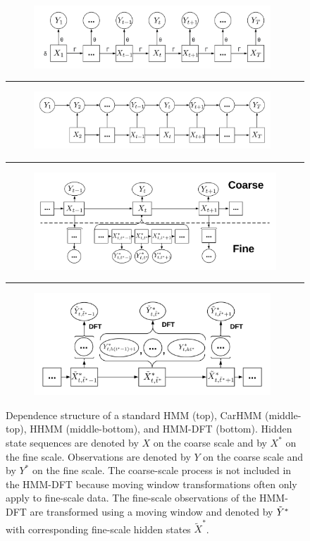 
\begin{figure}[ht]
    \begin{subfigure}{\textwidth}
      \centering
      \includegraphics[width=3.5in]{../Plots/HMM.png}  
      \label{fig:HMM}
    \end{subfigure}
    \hrule
    \begin{subfigure}{\textwidth}
      \centering
      \includegraphics[width=3.5in]{../Plots/CarHMM.png}  
      \label{fig:CarHMM}
    \end{subfigure}
    \hrule
    \begin{subfigure}{\textwidth}
      \centering
      \includegraphics[width=3.75in]{../Plots/HHMM.png}  
      \label{fig:HHMM}
    \end{subfigure}
    \hrule
    \begin{subfigure}{\textwidth}
      \centering
      \includegraphics[width=3.5in]{../Plots/HMM-DFT.png}  
      \label{fig:HMM-DFT}
    \end{subfigure}
    \caption{Dependence structure of a standard HMM (top), CarHMM (middle-top), HHMM (middle-bottom), and HMM-DFT (bottom). Hidden state sequences are denoted by $X$ on the coarse scale and by $X^*$ on the fine scale. Observations are denoted by $Y$ on the coarse scale and by $Y^*$ on the fine scale. The coarse-scale process is not included in the HMM-DFT because moving window transformations often only apply to fine-scale data. The fine-scale observations of the HMM-DFT are transformed using a moving window and denoted by $\tilde{Y}^*$ with corresponding fine-scale hidden states $\tilde X^*$.}
    \label{fig:models}
\end{figure}

